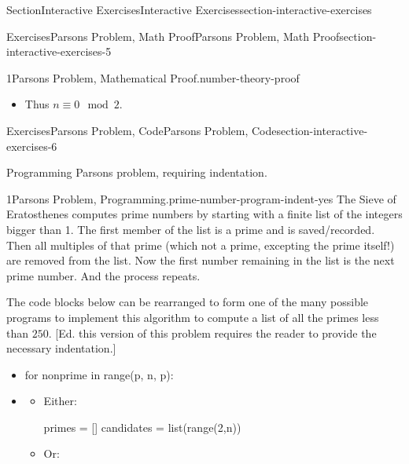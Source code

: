 \documentclass[twoside,10pt,]{article}
\numberwithin{equation}{section}
\begin{document}
\begin{sectionptx}{Section}{Interactive Exercises}{}{Interactive Exercises}{}{}{section-interactive-exercises}
\begin{exercises-subsection}{Exercises}{Parsons Problem, Math Proof}{}{Parsons Problem, Math Proof}{}{}{section-interactive-exercises-5}
\begin{divisionexercise}{1}{Parsons Problem, Mathematical Proof.}{}{number-theory-proof}
\begin{itemize}[label=\textbullet]
\begin{equation*}
n = 2m + 0\text{.}
\end{equation*}
%
\par
This is a superfluous second paragraph in this block.%
\item{}Thus \(n\equiv 0\mod 2\).%
\end{itemize}
%
\end{divisionexercise}%
\end{exercises-subsection}
%
%
\typeout{************************************************}
\typeout{************************************************}
%
\begin{exercises-subsection}{Exercises}{Parsons Problem, Code}{}{Parsons Problem, Code}{}{}{section-interactive-exercises-6}
\begin{introduction}{}%
Programming Parsons problem, requiring indentation.%
\end{introduction}%
\begin{divisionexercise}{1}{Parsons Problem, Programming.}{}{prime-number-program-indent-yes}%
%
%
The Sieve of Eratosthenes computes prime numbers by starting with a finite list of the integers bigger than 1.  The first member of the list is a prime and is saved\slash{}recorded.  Then all multiples of that prime (which not a prime, excepting the prime itself!) are removed from the list.  Now the first number remaining in the list is the next prime number.  And the process repeats.%
\par
The code blocks below can be rearranged to form one of the many possible programs to implement this algorithm to compute a list of all the primes less than \(250\). [Ed. this version of this problem requires the reader to provide the necessary indentation.]%
\par
%
\begin{itemize}[label=\textbullet]
\item{}%
\begin{codedisplayleft}
for nonprime in range(p, n, p):
\end{codedisplayleft}
%
\item{}%
\begin{itemize}[label=]
\item{}Either:%
\par
%
\begin{codedisplay}
primes = []
candidates = list(range(2,n))
\end{codedisplay}
%
\item{}Or:%
\par

\end{itemize}
\end{itemize}
\end{divisionexercise}
\end{exercises-subsection}
\end{sectionptx}
\end{document}

